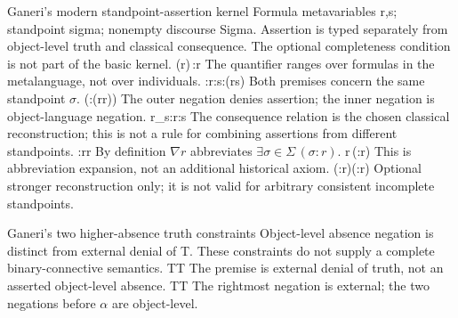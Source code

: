  {Ganeri's modern standpoint-assertion kernel}
 {Formula metavariables r,s; standpoint sigma; nonempty discourse Sigma.
 Assertion is typed separately from object-level truth and classical consequence.
 The optional completeness condition is not part of the basic kernel.}
 {\sigma\in\Sigma}{(\exists r)\,\sigma:r}
 {The quantifier ranges over formulas in the metalanguage, not over individuals.}
 {\sigma:r\quad\sigma:s}{\sigma:(r\land s)}
 {Both premises concern the same standpoint \(\sigma\).}
 {\sigma\in\Sigma}{\neg(\sigma:(r\land\neg r))}
 {The outer negation denies assertion; the inner negation is object-language negation.}
 {r\vdash_{}s\quad\sigma:r}{\sigma:s}
 {The consequence relation is the chosen classical reconstruction; this is not a rule
 for combining assertions from different standpoints.}
 {\sigma\in\Sigma\quad\sigma:r}{\nabla r}
 {By definition \(\nabla r\) abbreviates \(\exists\sigma\in\Sigma\,(\sigma:r)\).}
 {\nabla r}{\exists\sigma\in\Sigma\,(\sigma:r)}
 {This is abbreviation expansion, not an additional historical axiom.}
 {\sigma\in\Sigma}{(\sigma:r)\lor(\sigma:\neg r)}
 {Optional stronger reconstruction only; it is not valid for arbitrary consistent
 incomplete standpoints.}

 {Ganeri's two higher-absence truth constraints}
 {Object-level absence negation is distinct from external denial of T.
 These constraints do not supply a complete binary-connective semantics.}
 {\neg T\alpha}{T\neg\alpha}
 {The premise is external denial of truth, not an asserted object-level absence.}
 {}{T\neg\neg\alpha\leftrightarrow\neg T\neg\alpha}
 {The rightmost negation is external; the two negations before \(\alpha\) are object-level.}
